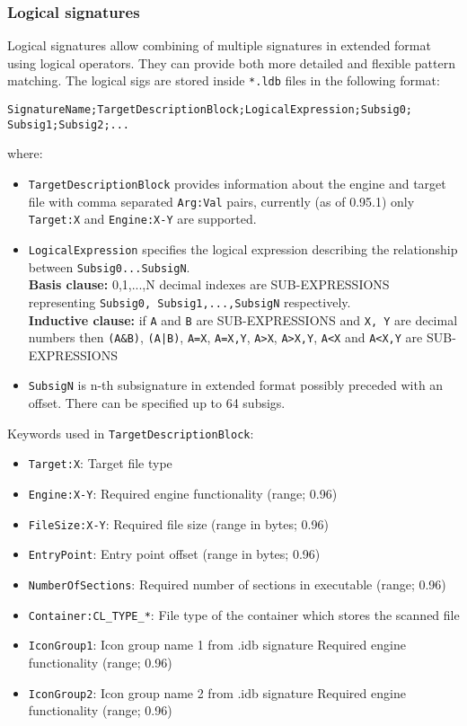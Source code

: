 \documentclass[a4paper,titlepage,12pt]{article}
\begin{document}
    \subsubsection{Logical signatures}\label{ndb}
    Logical signatures allow combining of multiple signatures in extended
    format using logical operators. They can provide both more detailed and
    flexible pattern matching. The logical sigs are stored inside \verb+*.ldb+
    files in the following format:
    \begin{verbatim}
SignatureName;TargetDescriptionBlock;LogicalExpression;Subsig0;
Subsig1;Subsig2;...
    \end{verbatim}
    where:
    \begin{itemize}
	\item \verb+TargetDescriptionBlock+ provides information about the
	engine and target file with comma separated \verb+Arg:Val+ pairs,
	currently (as of 0.95.1) only \verb+Target:X+ and \verb+Engine:X-Y+
	are supported.
	\item \verb+LogicalExpression+ specifies the logical expression
	describing the relationship between \verb+Subsig0...SubsigN+.\\
	\textbf{Basis clause:} 0,1,...,N decimal indexes are SUB-EXPRESSIONS
	representing \verb+Subsig0, Subsig1,...,SubsigN+ respectively.\\
	\textbf{Inductive clause:} if \verb+A+ and \verb+B+ are
	SUB-EXPRESSIONS and \verb+X, Y+ are decimal numbers then
	\verb+(A&B)+, \verb+(A|B)+, \verb+A=X+, \verb+A=X,Y+, \verb+A>X+,
	\verb+A>X,Y+, \verb+A<X+ and \verb+A<X,Y+ are SUB-EXPRESSIONS
	\item \verb+SubsigN+ is n-th subsignature in extended format possibly
	preceded with an offset. There can be specified up to 64 subsigs.
    \end{itemize}
    Keywords used in \verb+TargetDescriptionBlock+:
    \begin{itemize}
	\item \verb+Target:X+: Target file type
	\item \verb+Engine:X-Y+: Required engine functionality (range; 0.96)
	\item \verb+FileSize:X-Y+: Required file size (range in bytes; 0.96)
	\item \verb+EntryPoint+: Entry point offset (range in bytes; 0.96)
	\item \verb+NumberOfSections+: Required number of sections in executable (range; 0.96)
	\item \verb+Container:CL_TYPE_*+: File type of the container which stores the scanned file
	\item \verb+IconGroup1+: Icon group name 1 from .idb signature Required engine functionality (range; 0.96)
	\item \verb+IconGroup2+: Icon group name 2 from .idb signature Required engine functionality (range; 0.96)
    \end{itemize}
\end{document}
